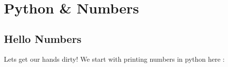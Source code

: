 
\chapter{Python \& Numbers}

\section{Hello Numbers}

Lets get our hands dirty! We start with printing numbers in python here :

